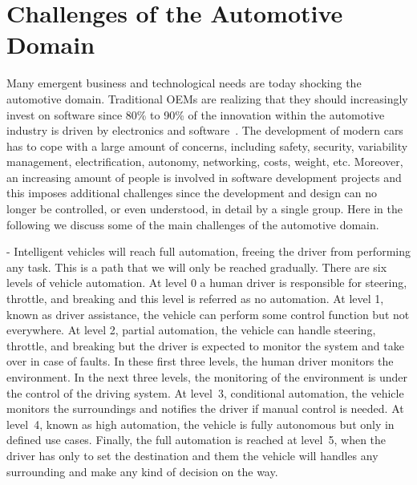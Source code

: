 \section{Challenges of the Automotive Domain}\label{sec:challenges}

Many emergent business and technological needs are today shocking the automotive domain. Traditional OEMs are realizing that they should increasingly invest on software since 80\% to 90\% of the innovation within the automotive industry
is driven by electronics and software~\cite{softwareAutomotive}. The development of modern cars has to cope with a large amount of concerns, including safety, security, variability management, electrification, autonomy, networking, costs, weight, etc. Moreover, an increasing amount of people is involved in software development projects and this imposes additional challenges since the development and design can no longer be controlled, or even understood, in detail by
a single group. Here in the following we discuss some of the main challenges of the automotive domain.

 -
Intelligent vehicles will reach full automation, freeing the driver from performing
any task. This is a path that we will only be reached gradually. There are six levels
of vehicle automation. At level 0 a human driver is responsible for steering, throttle, and breaking and this level is referred as no automation. 
At level 1, known as driver assistance, the vehicle can perform some control function but not everywhere. At level 2, partial automation, the vehicle can handle steering, throttle, and breaking but the driver
is expected to monitor the system and take over in case of faults. In these first three levels, the human driver
monitors the environment. In the next three levels, the monitoring of the environment is under the control of the driving system. At level~3, conditional automation, the vehicle monitors the surroundings and notifies the driver if manual control is needed. At level~4, known as high automation, the vehicle is fully autonomous but only in defined use cases. Finally, the full automation is reached at level~5, when the driver has only to set the destination and them the vehicle will handles any surrounding and make any kind of decision on the way.

